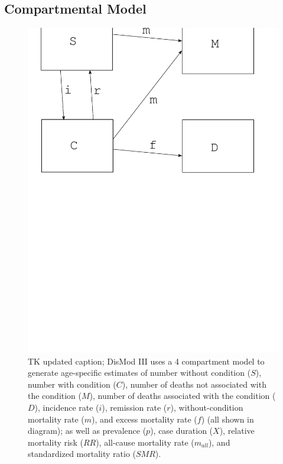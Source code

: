 \subsection{Compartmental Model}
\begin{figure}
\begin{center}
\includegraphics[width=\textwidth]{compartments.pdf}
\end{center}
\caption{TK updated caption; DisMod III uses a 4 compartment model to generate
  age-specific estimates of number without condition ($S$), number
  with condition ($C$), number of deaths not associated with the condition ($M$),
  number of deaths associated with the condition ($D$), incidence rate ($i$),
  remission rate ($r$), without-condition mortality rate ($m$), and
  excess mortality rate ($f$) (all shown in diagram); as well as
  prevalence ($p$), case duration ($X$), relative mortality risk ($RR$), all-cause mortality
  rate ($m_{all}$), and standardized mortality ratio ($SMR$).}
\label{fig:compartmental-model}
\end{figure}

